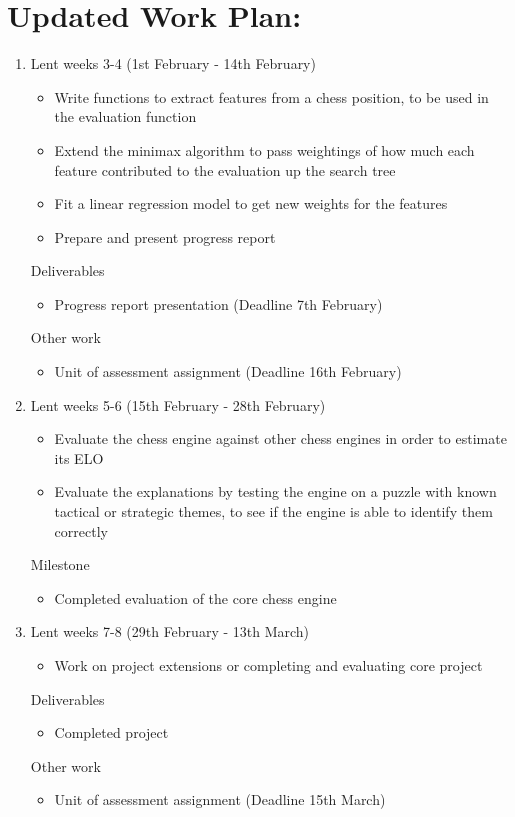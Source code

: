 \documentclass[12pt,a4paper]{article}
\begin{document}
\section*{Updated Work Plan:}
\begin{enumerate}
    \item Lent weeks 3-4 (1st February - 14th February)
    \begin{itemize}
        \item Write functions to extract features from a chess position, to be used in the evaluation function
        \item Extend the minimax algorithm to pass weightings of how much each feature contributed to the evaluation up the search tree
        \item Fit a linear regression model to get new weights for the features
        \item Prepare and present progress report
    \end{itemize}
    Deliverables
    \begin{itemize}
        \item Progress report presentation (Deadline 7th February)
    \end{itemize}
    Other work
    \begin{itemize}
        \item Unit of assessment assignment (Deadline 16th February)
    \end{itemize}

    \item Lent weeks 5-6 (15th February - 28th February)
    \begin{itemize}
        \item Evaluate the chess engine against other chess engines in order to estimate its ELO
        \item Evaluate the explanations by testing the engine on a puzzle with known tactical or strategic themes, to see if the engine is able to identify them correctly
    \end{itemize}
    Milestone
    \begin{itemize}
        \item Completed evaluation of the core chess engine
    \end{itemize}

    \item Lent weeks 7-8 (29th February - 13th March)
    \begin{itemize}
        \item Work on project extensions or completing and evaluating core project
    \end{itemize}
    Deliverables
    \begin{itemize}
        \item Completed project
    \end{itemize}
    Other work
    \begin{itemize}
        \item Unit of assessment assignment (Deadline 15th March)
    \end{itemize}


\end{enumerate}
\end{document}

